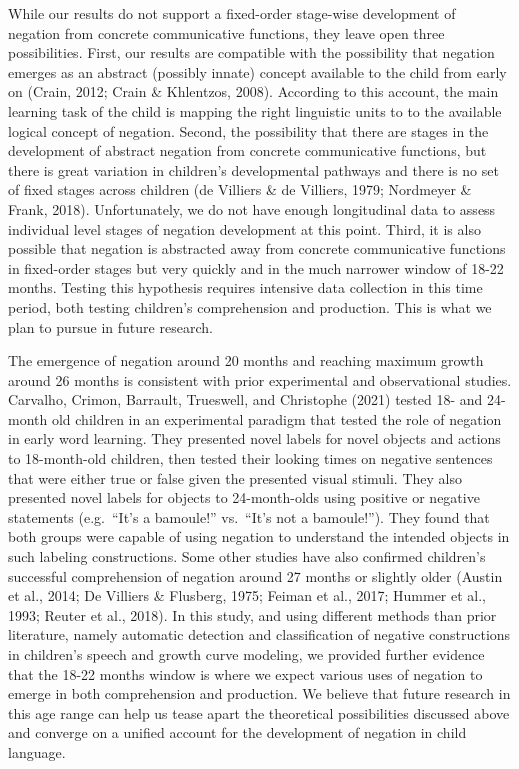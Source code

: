 \documentclass[
  man,floatsintext]{apa6}
\begin{document}
While our results do not support a fixed-order stage-wise development of negation from concrete communicative functions, they leave open three possibilities. First, our results are compatible with the possibility that negation emerges as an abstract (possibly innate) concept available to the child from early on (Crain, 2012; Crain \& Khlentzos, 2008). According to this account, the main learning task of the child is mapping the right linguistic units to to the available logical concept of negation. Second, the possibility that there are stages in the development of abstract negation from concrete communicative functions, but there is great variation in children's developmental pathways and there is no set of fixed stages across children (de Villiers \& de Villiers, 1979; Nordmeyer \& Frank, 2018). Unfortunately, we do not have enough longitudinal data to assess individual level stages of negation development at this point. Third, it is also possible that negation is abstracted away from concrete communicative functions in fixed-order stages but very quickly and in the much narrower window of 18-22 months. Testing this hypothesis requires intensive data collection in this time period, both testing children's comprehension and production. This is what we plan to pursue in future research.

The emergence of negation around 20 months and reaching maximum growth around 26 months is consistent with prior experimental and observational studies. Carvalho, Crimon, Barrault, Trueswell, and Christophe (2021) tested 18- and 24- month old children in an experimental paradigm that tested the role of negation in early word learning. They presented novel labels for novel objects and actions to 18-month-old children, then tested their looking times on negative sentences that were either true or false given the presented visual stimuli. They also presented novel labels for objects to 24-month-olds using positive or negative statements (e.g.~``It's a bamoule!'' vs.~``It's not a bamoule!''). They found that both groups were capable of using negation to understand the intended objects in such labeling constructions. Some other studies have also confirmed children's successful comprehension of negation around 27 months or slightly older (Austin et al., 2014; De Villiers \& Flusberg, 1975; Feiman et al., 2017; Hummer et al., 1993; Reuter et al., 2018). In this study, and using different methods than prior literature, namely automatic detection and classification of negative constructions in children's speech and growth curve modeling, we provided further evidence that the 18-22 months window is where we expect various uses of negation to emerge in both comprehension and production. We believe that future research in this age range can help us tease apart the theoretical possibilities discussed above and converge on a unified account for the development of negation in child language.
\end{document}
